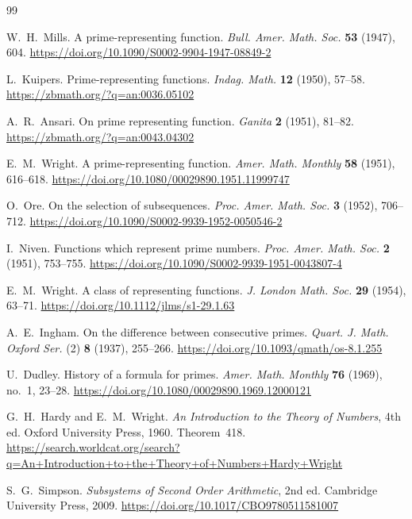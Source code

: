 \documentclass[11pt,reqno]{amsart}
\theoremstyle{redplain}
\numberwithin{equation}{section}
\begin{document}
\begin{thebibliography}{99}
	
	 W.~H.~Mills. A prime-representing function. \emph{Bull.
		Amer. Math. Soc.} \textbf{53} (1947), 604.
	\url{https://doi.org/10.1090/S0002-9904-1947-08849-2}
	
	 L.~Kuipers. Prime-representing functions. \emph{Indag.
		Math.} \textbf{12} (1950), 57--58.
	\url{https://zbmath.org/?q=an:0036.05102}
	
	 A.~R.~Ansari. On prime representing function. \emph{Ganita}
	\textbf{2} (1951), 81--82.
	\url{https://zbmath.org/?q=an:0043.04302}
	
	 E.~M.~Wright. A prime-representing function. \emph{Amer.
		Math. Monthly} \textbf{58} (1951), 616--618.
	\url{https://doi.org/10.1080/00029890.1951.11999747}
	
	 O.~Ore. On the selection of subsequences. \emph{Proc. Amer.
		Math. Soc.} \textbf{3} (1952), 706--712.
	\url{https://doi.org/10.1090/S0002-9939-1952-0050546-2}
	
	 I.~Niven. Functions which represent prime numbers. \emph{Proc.
		Amer. Math. Soc.} \textbf{2} (1951), 753--755.
	\url{https://doi.org/10.1090/S0002-9939-1951-0043807-4}
	
	 E.~M.~Wright. A class of representing functions. \emph{J.
		London Math. Soc.} \textbf{29} (1954), 63--71.
	\url{https://doi.org/10.1112/jlms/s1-29.1.63}
	
	 A.~E.~Ingham. On the difference between consecutive
	primes. \emph{Quart. J. Math. Oxford Ser.} (2) \textbf{8} (1937), 255--266.
	\url{https://doi.org/10.1093/qmath/os-8.1.255}
	
	 U.~Dudley. History of a formula for primes. \emph{Amer.
		Math. Monthly} \textbf{76} (1969), no.~1, 23--28.
	\url{https://doi.org/10.1080/00029890.1969.12000121}
	
	 G.~H.~Hardy and E.~M.~Wright. \emph{An Introduction to
		the Theory of Numbers}, 4th ed. Oxford University Press, 1960. Theorem~418.
	\url{https://search.worldcat.org/search?q=An+Introduction+to+the+Theory+of+Numbers+Hardy+Wright}
	
	 S.~G.~Simpson. \emph{Subsystems of Second Order
		Arithmetic}, 2nd ed. Cambridge University Press, 2009.
	\url{https://doi.org/10.1017/CBO9780511581007}
	

\end{thebibliography}
\end{document}
